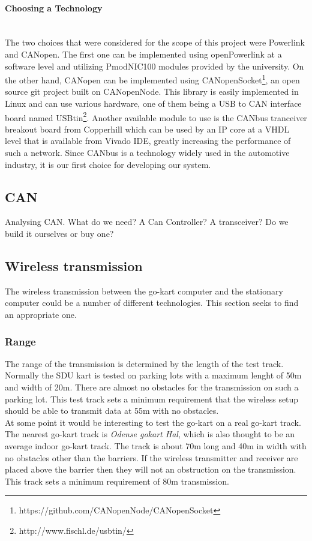 \paragraph{Choosing a Technology}~\\
The two choices that were considered for the scope of this project were Powerlink and CANopen.
The first one can be implemented using openPowerlink at a software level and utilizing PmodNIC100 modules provided by the university.
On the other hand, CANopen can be implemented using CANopenSocket\footnote{https://github.com/CANopenNode/CANopenSocket}, an open source git project built on CANopenNode.
This library is easily implemented in Linux and can use various hardware, one of them being a USB to CAN interface board named USBtin\footnote{http://www.fischl.de/usbtin/}.
Another available module to use is the CANbus tranceiver breakout board from Copperhill which can be used by an IP core at a VHDL level that is available from Vivado IDE, greatly increasing the performance of such a network.
Since CANbus is a technology widely used in the automotive industry, it is our first choice for developing our system.



\subsection{CAN}
Analysing CAN. What do we need?
A Can Controller?
A transceiver? Do we build it ourselves or buy one?




\subsection{Wireless transmission}
The wireless transmission between the go-kart computer and the stationary computer could be a number of different technologies.
This section seeks to find an appropriate one.

\subsubsection{Range}
The range of the transmission is determined by the length of the test track. 
Normally the SDU kart is tested on parking lots with a maximum lenght of 50m and width of 20m.
There are almost no obstacles for the transmission on such a parking lot. 
This test track sets a minimum requirement that the wireless setup should be able to transmit data at 55m with no obstacles.
\\
At some point it would be interesting to test the go-kart on a real go-kart track. 
The nearest go-kart track is \textit{Odense gokart Hal}, which is also thought to be an average indoor go-kart track.
The track is about 70m long and 40m in width with no obstacles other than the barriers. 
If the wireless transmitter and receiver are placed above the barrier then they will not an obstruction on the transmission. 
This track sets a minimum requirement of 80m transmission. 

